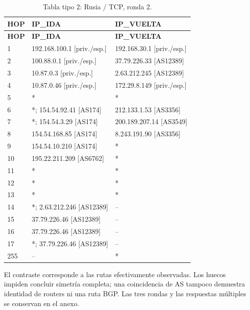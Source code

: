 \begin{longtable}{p{0.95cm}p{7.075cm}p{7.075cm}}
\caption{Tabla tipo 2: Rusia / TCP, ronda 2.}\label{tabla2:37.79.226.46:TCP} \\
\toprule
\textbf{HOP} & \textbf{IP\_\allowbreak{}IDA} & \textbf{IP\_\allowbreak{}VUELTA} \\ \midrule
\endfirsthead
\toprule
\textbf{HOP} & \textbf{IP\_\allowbreak{}IDA} & \textbf{IP\_\allowbreak{}VUELTA} \\ \midrule
\endhead
1 & 192.168.100.1 [priv./esp.] & 192.168.30.1 [priv./esp.] \\
2 & 100.88.0.1 [priv./esp.] & 37.79.226.33 [AS12389] \\
3 & 10.87.0.3 [priv./esp.] & 2.63.212.245 [AS12389] \\
4 & 10.87.0.46 [priv./esp.] & 172.29.8.149 [priv./esp.] \\
5 & * & * \\
6 & *; 154.54.92.41 [AS174] & 212.133.1.53 [AS3356] \\
7 & *; 154.54.3.29 [AS174] & 200.189.207.14 [AS3549] \\
8 & 154.54.168.85 [AS174] & 8.243.191.90 [AS3356] \\
9 & 154.54.10.210 [AS174] & * \\
10 & 195.22.211.209 [AS6762] & * \\
11 & * & * \\
12 & * & * \\
13 & * & * \\
14 & *; 2.63.212.246 [AS12389] & -- \\
15 & 37.79.226.46 [AS12389] & -- \\
16 & 37.79.226.46 [AS12389] & -- \\
17 & *; 37.79.226.46 [AS12389] & -- \\
255 & -- & * \\
\bottomrule
\end{longtable}
\endgroup
El contraste corresponde a las rutas efectivamente observadas. Los huecos impiden concluir simetría completa; una coincidencia de AS tampoco demuestra identidad de routers ni una ruta BGP. Las tres rondas y las respuestas múltiples se conservan en el anexo.

